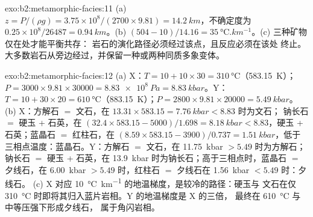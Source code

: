 \begin{solution}{exo:b2:metamorphic-facies:11}
(a) $z = P/(\rho g) = 3.75\times10^8/(2700\times9.81) = \qty{14.2}{km}$，不确定度为
$0.25\times10^8/26487 = \qty{0.94}{km}$。(b) $(504 - 10)/14.16 =
\qty{35}{\celsius.km^{-1}}$。(c) 三种矿物仅在处才能平衡共存：
岩石的演化路径必须经过该点，且反应必须在该处
终止。大多数岩石从旁边经过，并保留一种或两种同质多象变体。
\end{solution}

\begin{solution}{exo:b2:metamorphic-facies:12}
(a) X：$T = 10 + 10\times30 = \qty{310}{\celsius}$（\qty{583.15}{K}）；$P = 3000\times
9.81\times30000 = \qty{8.83e8}{Pa} = \qty{8.83}{kbar}$。Y：$T = 10 + 30\times20 =
\qty{610}{\celsius}$（\qty{883.15}{K}）；$P = 2800\times9.81\times20000 = \qty{5.49}{kbar}$。
(b) X：方解石 $=$ 文石，在 $13.31\times583.15 = \qty{7.76}{kbar} < 8.83$ 时为文石；
钠长石 $=$ 硬玉 + 石英，在 $(32.4\times583.15 - 5000)/1.698 = \qty{8.18}{kbar} <
8.83$，硬玉 + 石英；蓝晶石 $=$ 红柱石，在 $(8.59\times583.15 - 3900)/0.737 =
\qty{1.51}{kbar}$，低于三相点温度：蓝晶石。Y：方解石 $=$
文石，在 \qty{11.75}{kbar} $> 5.49$ 时为方解石；钠长石 $=$ 硬玉 + 石英，在
\qty{13.9}{kbar} 时为钠长石；高于三相点时，蓝晶石 $=$ 夕线石，在
\qty{6.00}{kbar} $> 5.49$ 时，红柱石 $=$ 夕线石在 \qty{1.56}{kbar} $< 5.49$ 时：夕线石。
(c) X 对应 \qty{10}{\celsius\per\km} 的地温梯度，是较冷的路径：硬玉与
文石在仅 \qty{310}{\celsius} 时即将其归入蓝片岩相。Y 的地温梯度是 X 的三倍，
最终在 \qty{610}{\celsius} 与中等压强下形成夕线石，
属于角闪岩相。
\end{solution}

